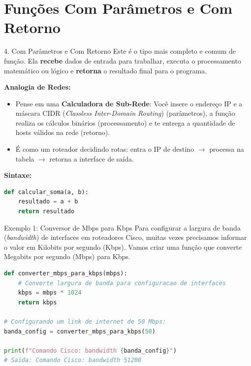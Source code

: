 \section{Funções Com Parâmetros e Com Retorno}

\begin{frame}[fragile]{4. Com Parâmetros e Com Retorno}
    Este é o tipo mais completo e comum de função. Ela \textbf{recebe} dados de entrada para trabalhar, executa o processamento matemático ou lógico e \textbf{retorna} o resultado final para o programa.
    
    \vspace{0.3cm}
    \textbf{Analogia de Redes:}
    \begin{itemize}
        \item Pense em uma \textbf{Calculadora de Sub-Rede}: Você insere o endereço IP e a máscara CIDR (\textit{Classless Inter-Domain Routing}) (parâmetros), a função realiza os cálculos binários (processamento) e te entrega a quantidade de hosts válidos na rede (retorno).
        \item É como um roteador decidindo rotas: entra o IP de destino $\rightarrow$ processa na tabela $\rightarrow$ retorna a interface de saída.
    \end{itemize}
    
    \vspace{0.3cm}
    \textbf{Sintaxe:}
    \begin{lstlisting}[language=Python]
def calcular_soma(a, b):
    resultado = a + b
    return resultado
    \end{lstlisting}
\end{frame}

\begin{frame}[fragile]{Exemplo 1: Conversor de Mbps para Kbps}
    Para configurar a largura de banda (\textit{bandwidth}) de interfaces em roteadores Cisco, muitas vezes precisamos informar o valor em Kilobits por segundo (Kbps). Vamos criar uma função que converte Megabits por segundo (Mbps) para Kbps.
    
    \begin{lstlisting}[language=Python]
def converter_mbps_para_kbps(mbps):
    # Converte largura de banda para configuracao de interfaces
    kbps = mbps * 1024
    return kbps

# Configurando um link de internet de 50 Mbps:
banda_config = converter_mbps_para_kbps(50)

print(f"Comando Cisco: bandwidth {banda_config}")
# Saida: Comando Cisco: bandwidth 51200
    \end{lstlisting}
\end{frame}

